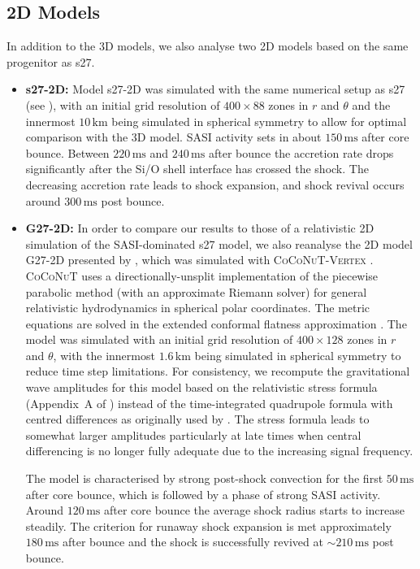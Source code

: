 \subsection{2D Models}
{In addition to the 3D models, we also analyse two 2D models based on the same progenitor
as s27. 
\begin{itemize}
\item \textbf{s27-2D:} Model s27-2D was simulated with the same numerical setup as s27 (see \citealp{hanke_13}),
with an initial grid resolution of $400 \times 88$ zones in $r$ and $\theta$ and the 
innermost $10 \, \mathrm{km}$ being simulated in spherical symmetry to allow for
optimal comparison with the 3D model.
SASI activity sets in about $150 \, \mathrm{ms}$ after
core bounce. Between $220 \, \mathrm{ms}$ and $240 \, \mathrm{ms}$ after bounce the accretion rate drops significantly
after the Si/O shell interface has crossed the shock.
The decreasing accretion rate leads to shock expansion, and
shock revival occurs around $300 \, \mathrm{ms}$ post bounce.
\end{itemize}
\begin{itemize}
\item \textbf{G27-2D:} In order to compare our results to those of a 
relativistic 2D simulation of the SASI-dominated s27 model, 
we also reanalyse the 2D model G27-2D presented
by \cite{mueller_13}, which was simulated with \textsc{CoCoNuT-Vertex} \citep{mueller_10}. 
\textsc{CoCoNuT} \citep{dimmelmeier_02_a,dimmelmeier_04} uses a
directionally-unsplit implementation of the piecewise parabolic
method (with an approximate Riemann solver) for general relativistic hydrodynamics in spherical polar coordinates. 
The metric equations are solved in the extended conformal flatness approximation \citep{cordero_09}. 
The model was simulated with an initial grid resolution of $400 \times 128$ zones in $r$ and $\theta$, 
with the innermost $1.6 \, \mathrm{km}$ being simulated in spherical symmetry to reduce time step limitations.
For consistency, we recompute the gravitational wave amplitudes for this model based on the relativistic stress formula 
(Appendix~A of \citealp{mueller_13}) instead of the time-integrated quadrupole formula with centred differences as originally used by \cite{mueller_13}. 
The stress formula leads to somewhat larger amplitudes particularly at late times when central differencing
is no longer fully adequate due to the increasing signal frequency.

The model is characterised by strong post-shock convection for the first $50 \, \mathrm{ms}$
after core bounce, which is followed by a phase of
strong SASI activity. Around $120 \, \mathrm{ms}$ after core bounce the average
shock radius starts to increase steadily. The criterion for runaway shock expansion is met
approximately $180 \, \mathrm{ms}$ after bounce and 
the shock is successfully revived at $\mathord{\sim 210} \, \mathrm{ms}$ post bounce.


\end{itemize}}
